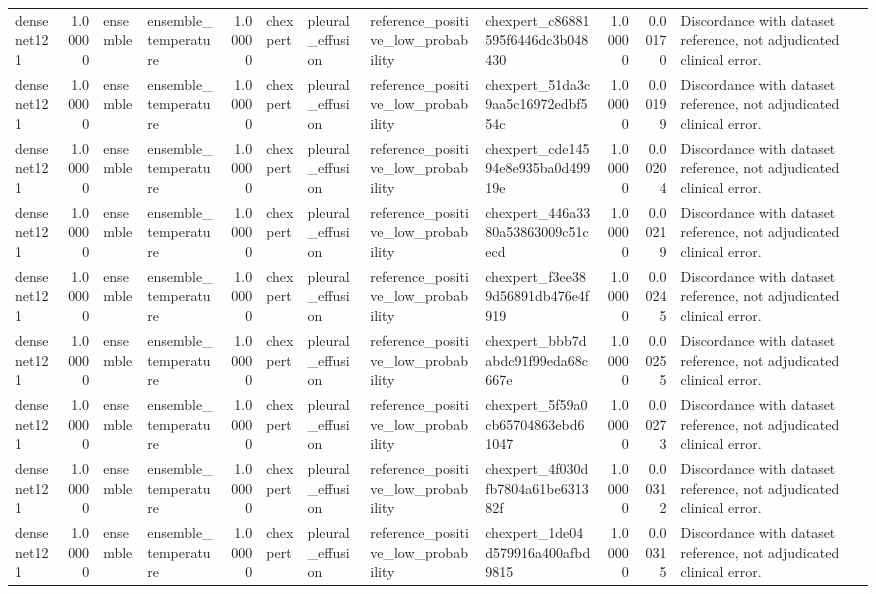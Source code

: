 \begin{tabular}{lrllrllllrrl}
densenet121 & 1.00000 & ensemble & ensemble\_temperature & 1.00000 & chexpert & pleural\_effusion & reference\_positive\_low\_probability & chexpert\_c86881595f6446dc3b048430 & 1.00000 & 0.00170 & Discordance with dataset reference, not adjudicated clinical error. \\
densenet121 & 1.00000 & ensemble & ensemble\_temperature & 1.00000 & chexpert & pleural\_effusion & reference\_positive\_low\_probability & chexpert\_51da3c9aa5c16972edbf554c & 1.00000 & 0.00199 & Discordance with dataset reference, not adjudicated clinical error. \\
densenet121 & 1.00000 & ensemble & ensemble\_temperature & 1.00000 & chexpert & pleural\_effusion & reference\_positive\_low\_probability & chexpert\_cde14594e8e935ba0d49919e & 1.00000 & 0.00204 & Discordance with dataset reference, not adjudicated clinical error. \\
densenet121 & 1.00000 & ensemble & ensemble\_temperature & 1.00000 & chexpert & pleural\_effusion & reference\_positive\_low\_probability & chexpert\_446a3380a53863009c51cecd & 1.00000 & 0.00219 & Discordance with dataset reference, not adjudicated clinical error. \\
densenet121 & 1.00000 & ensemble & ensemble\_temperature & 1.00000 & chexpert & pleural\_effusion & reference\_positive\_low\_probability & chexpert\_f3ee389d56891db476e4f919 & 1.00000 & 0.00245 & Discordance with dataset reference, not adjudicated clinical error. \\
densenet121 & 1.00000 & ensemble & ensemble\_temperature & 1.00000 & chexpert & pleural\_effusion & reference\_positive\_low\_probability & chexpert\_bbb7dabdc91f99eda68c667e & 1.00000 & 0.00255 & Discordance with dataset reference, not adjudicated clinical error. \\
densenet121 & 1.00000 & ensemble & ensemble\_temperature & 1.00000 & chexpert & pleural\_effusion & reference\_positive\_low\_probability & chexpert\_5f59a0cb65704863ebd61047 & 1.00000 & 0.00273 & Discordance with dataset reference, not adjudicated clinical error. \\
densenet121 & 1.00000 & ensemble & ensemble\_temperature & 1.00000 & chexpert & pleural\_effusion & reference\_positive\_low\_probability & chexpert\_4f030dfb7804a61be631382f & 1.00000 & 0.00312 & Discordance with dataset reference, not adjudicated clinical error. \\
densenet121 & 1.00000 & ensemble & ensemble\_temperature & 1.00000 & chexpert & pleural\_effusion & reference\_positive\_low\_probability & chexpert\_1de04d579916a400afbd9815 & 1.00000 & 0.00315 & Discordance with dataset reference, not adjudicated clinical error. \\

\end{tabular}
